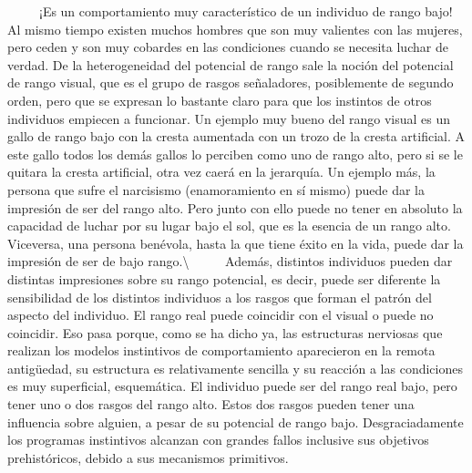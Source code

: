 ~ ~ ~ ¡Es un comportamiento muy característico de un individuo de rango
bajo! Al mismo tiempo existen muchos hombres que son muy valientes con
las mujeres, pero ceden y son muy cobardes en las condiciones cuando se
necesita luchar de verdad. De la heterogeneidad del potencial de rango
sale la noción del potencial de rango visual, que es el grupo de rasgos
señaladores, posiblemente de segundo orden, pero que se expresan lo
bastante claro para que los instintos de otros individuos empiecen a
funcionar. Un ejemplo muy bueno del rango visual es un gallo de rango
bajo con la cresta aumentada con un trozo de la cresta artificial. A
este gallo todos los demás gallos lo perciben como uno de rango alto,
pero si se le quitara la cresta artificial, otra vez caerá en la
jerarquía. Un ejemplo más, la persona que sufre el narcisismo
(enamoramiento en sí mismo) puede dar la impresión de ser del rango
alto. Pero junto con ello puede no tener en absoluto la capacidad de
luchar por su lugar bajo el sol, que es la esencia de un rango alto.
Viceversa, una persona benévola, hasta la que tiene éxito en la vida,
puede dar la impresión de ser de bajo rango.\textbackslash{} ~ ~ ~
Además, distintos individuos pueden dar distintas impresiones sobre su
rango potencial, es decir, puede ser diferente la sensibilidad de los
distintos individuos a los rasgos que forman el patrón del aspecto del
individuo. El rango real puede coincidir con el visual o puede no
coincidir. Eso pasa porque, como se ha dicho ya, las estructuras
nerviosas que realizan los modelos instintivos de comportamiento
aparecieron en la remota antigüedad, su estructura es relativamente
sencilla y su reacción a las condiciones es muy superficial,
esquemática. El individuo puede ser del rango real bajo, pero tener uno
o dos rasgos del rango alto. Estos dos rasgos pueden tener una
influencia sobre alguien, a pesar de su potencial de rango bajo.
Desgraciadamente los programas instintivos alcanzan con grandes fallos
inclusive sus objetivos prehistóricos, debido a sus mecanismos
primitivos.

